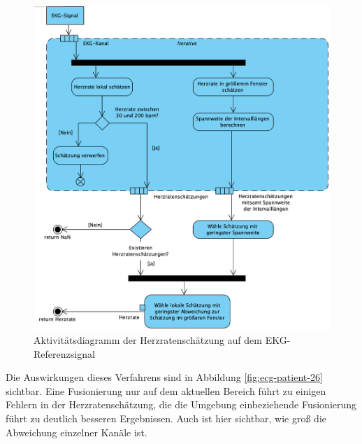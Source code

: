 	\begin{figure}[H]
		\centering
		\includegraphics[width=\textwidth]{pic/ecg-hr-estimation.png}
		\caption[Aktivitätsdiagramm der Herzratenschätzung auf dem EKG-Referenzsignal]{Aktivitätsdiagramm der Herzratenschätzung auf dem EKG-Referenzsignal}
		\label{fig:ecg-hr-estimation}
	\end{figure}

	
	Die Auswirkungen dieses Verfahrens sind in Abbildung \ref{fig:ecg-patient-26} sichtbar. Eine Fusionierung nur auf dem aktuellen Bereich führt zu einigen Fehlern in der Herzratenschätzung, die die Umgebung einbeziehende Fusionierung führt zu deutlich besseren Ergebnissen. Auch ist hier sichtbar, wie groß die Abweichung einzelner Kanäle ist.

